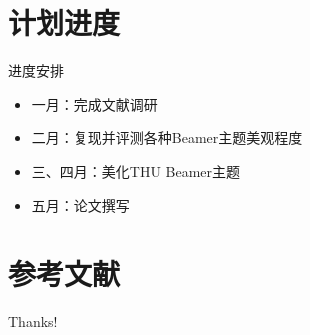 \documentclass[aspectratio=169]{beamer}
\begin{document}
\section{计划进度}

\begin{frame}{进度安排}
    \begin{itemize}
        \item 一月：完成文献调研
        \item 二月：复现并评测各种Beamer主题美观程度
        \item 三、四月：美化THU Beamer主题
        \item 五月：论文撰写
    \end{itemize}
\end{frame}

\section{参考文献}

\begin{frame}[allowframebreaks]
    \printbibliography
\end{frame}


\begin{frame}
    \begin{center}
        {\Huge\calligra Thanks!}
    \end{center}
\end{frame}
\end{document}
